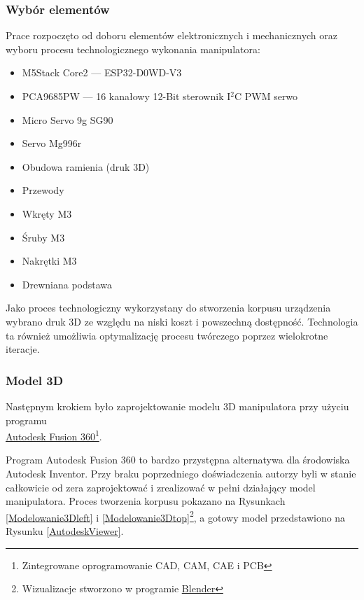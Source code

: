 \documentclass[11pt,titlepage]{article}
\begin{document}
\subsubsection{Wybór elementów}

Prace rozpoczęto od doboru elementów elektronicznych i mechanicznych oraz wyboru procesu technologicznego wykonania manipulatora:

\begin{itemize}
    \item M5Stack Core2 — ESP32-D0WD-V3
    \item PCA9685PW — 16 kanałowy 12-Bit sterownik I$^2$C PWM serwo
    \item Micro Servo 9g SG90
    \item Servo Mg996r
    \item Obudowa ramienia (druk 3D)
    \item Przewody
    \item Wkręty M3
    \item Śruby M3
    \item Nakrętki M3
    \item Drewniana podstawa
\end{itemize}

\medskip

Jako proces technologiczny wykorzystany do stworzenia korpusu urządzenia wybrano druk 3D ze względu na niski koszt i powszechną dostępność. Technologia ta również umożliwia optymalizację procesu twórczego poprzez wielokrotne iteracje.

\newpage

\subsubsection{Model 3D}

Następnym krokiem było zaprojektowanie modelu 3D manipulatora przy użyciu programu \\ \href{https://www.autodesk.pl/products/fusion-360}{\underline{Autodesk Fusion 360}\footnote{Zintegrowane oprogramowanie CAD, CAM, CAE i PCB}}.

Program Autodesk Fusion 360 to bardzo przystępna alternatywa dla środowiska Autodesk Inventor. Przy braku poprzedniego doświadczenia autorzy byli w stanie całkowicie od zera zaprojektować i zrealizować w pełni działający model manipulatora. Proces tworzenia korpusu pokazano na Rysunkach \ref{Modelowanie3Dleft} i \ref{Modelowanie3Dtop}\footnote{Wizualizacje stworzono w programie \href{https://www.blender.org}{\underline{Blender}}}, a gotowy model przedstawiono na Rysunku \ref{AutodeskViewer}.
\end{document}
